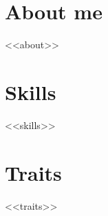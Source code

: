 \documentclass[12pt]{article}
\begin{document}
\maketitle

\section{About me}
<<about>>

\section{Skills}
\begin{itemize}
<<skills>>
\end{itemize}

\section{Traits}\label{results}
\begin{itemize}
<<traits>>
\end{itemize}
\end{document}
